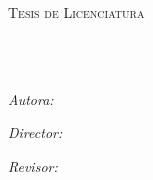 \documentclass[
11pt, %
spanish, %
singlespacing, %
headsepline, %
]{MastersDoctoralThesis} %
\author{Adriana F. Chávez De la Peña}%
\begin{document}
\frontmatter %

\pagestyle{plain} %


\begin{titlepage}
\begin{center}

\vspace*{.06\textheight}
{\scshape\LARGE \univname\par}\vspace{1.5cm} %
\textsc{\Large Tesis de Licenciatura}\\[0.5cm] %

\HRule \\[0.4cm] %
{\huge \bfseries \ttitle\par}\vspace{0.4cm} %
\HRule \\[1.5cm] %

\begin{minipage}[t]{0.4\textwidth}
\begin{center} \large
\emph{Autora:}\\
\href{adrifelcha@gmail.com}{\authorname} %
\end{center}
 
\begin{center} \large
\emph{Director:}\\
\href{abouzasr@gmail.com}{\supname} %
\end{center}

\begin{center} \large
\emph{Revisor:} \\
\href{germanpalafox@gmail.com}{\examname} %
\end{center}
\end{minipage}\\[2cm]




\end{center}
\end{titlepage}
\end{document}
